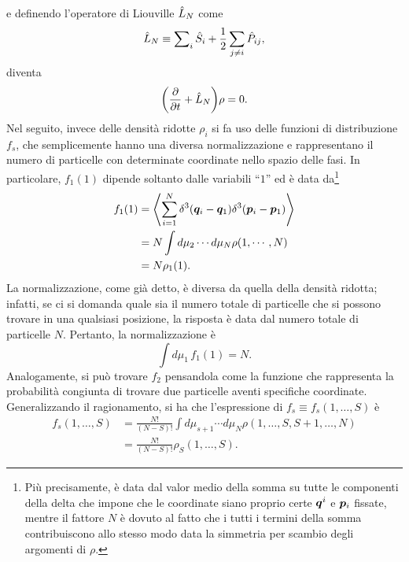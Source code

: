 e definendo l'operatore di Liouville $\hat{L}_N$ come
\begin{equation}
\label{eq: operatore di Liouville}
    \hat{L}_N \equiv \sum\nolimits_i\hat{S}_i + \frac{1}{2}\sum_{j\neq i}\hat{P}_{ij},
\end{equation}
diventa
\begin{equation}
\label{eq: evoluzione temporale densità di probabilità}
    \bigg(\frac{\partial}{\partial t} + \hat{L}_N\bigg)\rho = 0.
\end{equation}
Nel seguito, invece delle densità ridotte $\rho_i$ si fa uso delle funzioni di distribuzione $f_s$, che semplicemente hanno una diversa normalizzazione e rappresentano il numero di particelle con determinate coordinate nello spazio delle fasi. In particolare, $f_1(1)$ dipende soltanto dalle variabili ``$1$'' ed è data da\footnote{Più precisamente, è data dal valor medio della somma su tutte le componenti della delta che impone che le coordinate siano proprio certe $\bm{q}^i$ e $\bm{p}_i$ fissate, mentre il fattore $N$ è dovuto al fatto che i tutti i termini della somma contribuiscono allo stesso modo data la simmetria per scambio degli argomenti di $\rho$.}
\begin{equation}
    \begin{split}
        f_1(1) &= \left\langle \sum_{i=1}^N\delta^3(\bm{q}_i - \bm{q}_1)\delta^3(\bm{p}_i - \bm{p}_1) \right\rangle \\
        &= N\int d\mu_2\cdots d\mu_N\rho(1,\cdots,N) \\
        &= N\rho_1(1).
    \end{split}
\end{equation}
La normalizzazione, come già detto, è diversa da quella della densità ridotta; infatti, se ci si domanda quale sia il numero totale di particelle che si possono trovare in una qualsiasi posizione, la risposta è data dal numero totale di particelle $N$. Pertanto, la normalizzazione è
\begin{equation}
    \int d\mu_1\,f_1(1) = N.
\end{equation}
Analogamente, si può trovare $f_2$ pensandola come la funzione che rappresenta la probabilità congiunta di trovare due particelle aventi specifiche coordinate. Generalizzando il ragionamento, si ha che l'espressione di $f_s \equiv f_s(1,\dots,S)$ è
\begin{equation}
\label{eq: definizione funzioni di struttura}
    \begin{split}
        f_s(1,\dots,S) &= \frac{N!}{(N - S)!}\int d\mu_{s+1}\cdots d\mu_N\rho(1,\dots,S,S+1,\dots,N) \\
        &= \frac{N!}{(N - S)!}\rho_S(1,\dots,S).
    \end{split}
\end{equation}
